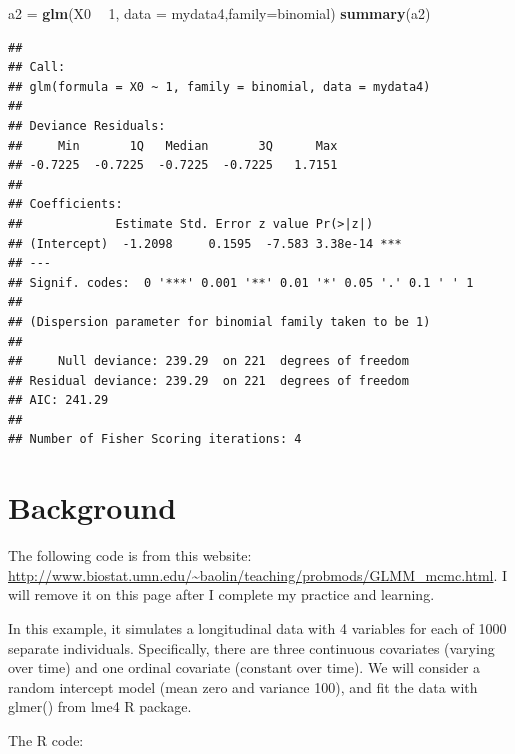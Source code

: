 \documentclass[]{book}
\newenvironment{Shaded}{\begin{snugshade}}{\end{snugshade}}
\newcommand{\DataTypeTok}[1]{\textcolor[rgb]{0.13,0.29,0.53}{#1}}
\newcommand{\DecValTok}[1]{\textcolor[rgb]{0.00,0.00,0.81}{#1}}
\newcommand{\KeywordTok}[1]{\textcolor[rgb]{0.13,0.29,0.53}{\textbf{#1}}}
\newcommand{\NormalTok}[1]{#1}
\newcommand{\OperatorTok}[1]{\textcolor[rgb]{0.81,0.36,0.00}{\textbf{#1}}}
\newcommand{\StringTok}[1]{\textcolor[rgb]{0.31,0.60,0.02}{#1}}
\begin{document}
\begin{Shaded}
\begin{Highlighting}[]
\NormalTok{a2 =}\StringTok{ }\KeywordTok{glm}\NormalTok{(X0 }\OperatorTok{~}\StringTok{ }\DecValTok{1}\NormalTok{, }\DataTypeTok{data =}\NormalTok{ mydata4,}\DataTypeTok{family=}\NormalTok{binomial)}
\KeywordTok{summary}\NormalTok{(a2)}
\end{Highlighting}
\end{Shaded}

\begin{verbatim}
## 
## Call:
## glm(formula = X0 ~ 1, family = binomial, data = mydata4)
## 
## Deviance Residuals: 
##     Min       1Q   Median       3Q      Max  
## -0.7225  -0.7225  -0.7225  -0.7225   1.7151  
## 
## Coefficients:
##             Estimate Std. Error z value Pr(>|z|)    
## (Intercept)  -1.2098     0.1595  -7.583 3.38e-14 ***
## ---
## Signif. codes:  0 '***' 0.001 '**' 0.01 '*' 0.05 '.' 0.1 ' ' 1
## 
## (Dispersion parameter for binomial family taken to be 1)
## 
##     Null deviance: 239.29  on 221  degrees of freedom
## Residual deviance: 239.29  on 221  degrees of freedom
## AIC: 241.29
## 
## Number of Fisher Scoring iterations: 4
\end{verbatim}

\hypertarget{background}{%
\section{Background}\label{background}}

The following code is from this website: \url{http://www.biostat.umn.edu/~baolin/teaching/probmods/GLMM_mcmc.html}. I will remove it on this page after I complete my practice and learning.

In this example, it simulates a longitudinal data with 4 variables for each of 1000 separate individuals. Specifically, there are three continuous covariates (varying over time) and one ordinal covariate (constant over time). We will consider a random intercept model (mean zero and variance 100), and fit the data with glmer() from lme4 R package.

The R code:
\end{document}
